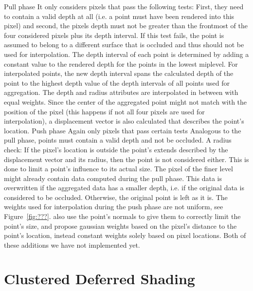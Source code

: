 \begin{outline}
\1 Pull phase
    \2 It only considers pixels that pass the following tests: First, they need to contain a valid depth at all (i.e. a point must have been rendered into this pixel) and second, the pixels depth must not be greater than the frontmost of the four considered pixels plus its depth interval. If this test fails, the point is assumed to belong to a different surface that is occluded and thus should not be used for interpolation.
    \2 The depth interval of each point is determined by adding a constant value to the rendered depth for the points in the lowest miplevel. For interpolated points, the new depth interval spans the calculated depth of the point to the highest depth value of the depth intervals of all points used for aggregation.
    \2 The depth and radius attributes are interpolated in between with equal weights. Since the center of the aggregated point might not match with the position of the pixel (this happens if not all four pixels are used for interpolation), a displacement vector is also calculated that describes the point's location.
\1 Push phase
    \2 Again only pixels that pass certain tests
        \3 Analogous to the pull phase, points must contain a valid depth and not be occluded.
        \3 A radius check: If the pixel's location is outside the point's extends described by the displacement vector and its radius, then the point is not considered either. This is done to limit a point's influence to its actual size.
    \2 The pixel of the finer level might already contain data computed during the pull phase. This data is overwritten if the aggregated data has a smaller depth, i.e. if the original data is considered to be occluded. Otherwise, the original point is left as it is.
    \2 The weights used for interpolation during the push phase are not uniform, see Figure~\ref{fig:???}.
\1 \citet{Marroquim:2007:reconstruction} also use the point's normals to give them to correctly limit the point's size, and \citet{Marroquim:2008:reconstruction2} propose gaussian weights based on the pixel's distance to the point's location, instead constant weights solely based on pixel locations. Both of these additions we have not implemented yet.
\end{outline}



\section{Clustered Deferred Shading}
\label{sec:concept:clusteredShading}

